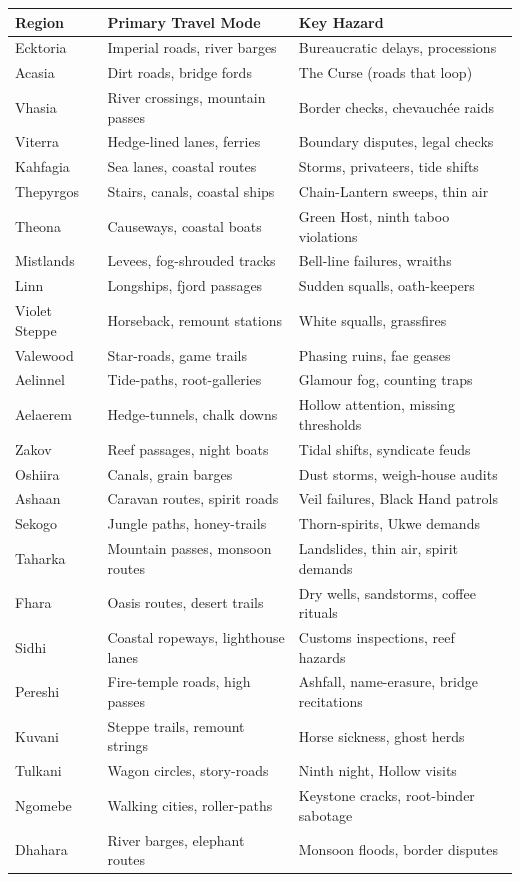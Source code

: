 \begin{center}
\begin{longtable}{lll}
\toprule
\textbf{Region} & \textbf{Primary Travel Mode} & \textbf{Key Hazard} \\
\midrule
Ecktoria & Imperial roads, river barges & Bureaucratic delays, processions \\
Acasia & Dirt roads, bridge fords & The Curse (roads that loop) \\
Vhasia & River crossings, mountain passes & Border checks, chevauchée raids \\
Viterra & Hedge-lined lanes, ferries & Boundary disputes, legal checks \\
Kahfagia & Sea lanes, coastal routes & Storms, privateers, tide shifts \\
Thepyrgos & Stairs, canals, coastal ships & Chain-Lantern sweeps, thin air \\
Theona & Causeways, coastal boats & Green Host, ninth taboo violations \\
Mistlands & Levees, fog-shrouded tracks & Bell-line failures, wraiths \\
Linn & Longships, fjord passages & Sudden squalls, oath-keepers \\
Violet Steppe & Horseback, remount stations & White squalls, grassfires \\
Valewood & Star-roads, game trails & Phasing ruins, fae geases \\
Aelinnel & Tide-paths, root-galleries & Glamour fog, counting traps \\
Aelaerem & Hedge-tunnels, chalk downs & Hollow attention, missing thresholds \\
Zakov & Reef passages, night boats & Tidal shifts, syndicate feuds \\
Oshiira & Canals, grain barges & Dust storms, weigh-house audits \\
Ashaan & Caravan routes, spirit roads & Veil failures, Black Hand patrols \\
Sekogo & Jungle paths, honey-trails & Thorn-spirits, Ukwe demands \\
Taharka & Mountain passes, monsoon routes & Landslides, thin air, spirit demands \\
Fhara & Oasis routes, desert trails & Dry wells, sandstorms, coffee rituals \\
Sidhi & Coastal ropeways, lighthouse lanes & Customs inspections, reef hazards \\
Pereshi & Fire-temple roads, high passes & Ashfall, name-erasure, bridge recitations \\
Kuvani & Steppe trails, remount strings & Horse sickness, ghost herds \\
Tulkani & Wagon circles, story-roads & Ninth night, Hollow visits \\
Ngomebe & Walking cities, roller-paths & Keystone cracks, root-binder sabotage \\
Dhahara & River barges, elephant routes & Monsoon floods, border disputes \\
\bottomrule
\end{longtable}
\end{center}

